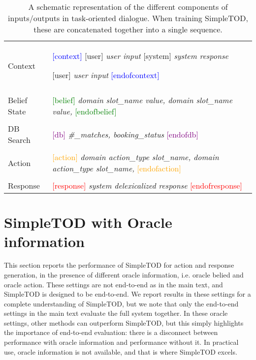 \documentclass{article}
\begin{document}
\begin{table}[htb!]
\small
\centering
\begin{tabular}{|l|l|}
\hline
Context & 
    \textcolor{blue}{[context]} 
    \textcolor{TealBlue}{[user]} 
    \textit{user input}
    \textcolor{Periwinkle}{[system]} 
    \textit{system response}
    
    \textcolor{TealBlue}{[user]} 
    \textit{user input} 
    \textcolor{blue}{[endofcontext]}
    \\& \\
Belief State &
 \textcolor{green}{[belief]}
 \textit{domain slot\_name value, domain slot\_name value, }
 \textcolor{green}{[endofbelief]}
 \\
 & \\
DB Search &  
\textcolor{purple}{[db]}
 \textit{\#\_matches, booking\_status}
 \textcolor{purple}{[endofdb]}
 \\& \\
Action & 
\textcolor{orange}{[action]}
 \textit{domain action\_type slot\_name, domain action\_type slot\_name, }  
 \textcolor{orange}{[endofaction]}
 \\& \\
Response &  
\textcolor{red}{[response]}
 \textit{system delexicalized response}
 \textcolor{red}{[endofresponse]}
 \\
\hline
\end{tabular}
\vspace{1mm}
\caption{A schematic representation of the different components of inputs/outputs in task-oriented dialogue. When training SimpleTOD, these are concatenated together into a single sequence.}
\label{tab:method}
\end{table}











\clearpage

\section{SimpleTOD with Oracle information}
\label{appendix:multiwoz_2.1}
This section reports the performance of SimpleTOD for action and response generation, in the presence of different oracle information, i.e. oracle belied and oracle action.
These settings are not end-to-end as in the main text, and SimpleTOD is designed to be end-to-end.
We report results in these settings for a complete understanding of SimpleTOD,
but we note that only the end-to-end settings in the main text evaluate the full system together. 
In these oracle settings, 
other methods can outperform SimpleTOD, 
but this simply highlights the importance of end-to-end evaluation: there is a disconnect between performance with oracle information and performance without it. 
In practical use, oracle information is not available, and that is where SimpleTOD excels.
\end{document}
